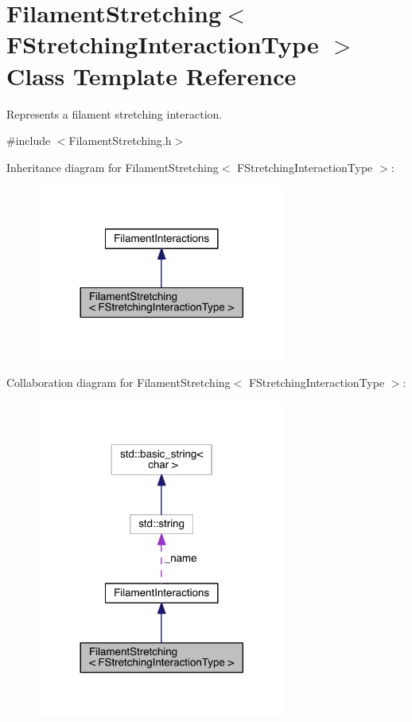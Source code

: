 \hypertarget{classFilamentStretching}{\section{Filament\+Stretching$<$ F\+Stretching\+Interaction\+Type $>$ Class Template Reference}
\label{classFilamentStretching}
}


Represents a filament stretching interaction.  




{\ttfamily \#include $<$Filament\+Stretching.\+h$>$}



Inheritance diagram for Filament\+Stretching$<$ F\+Stretching\+Interaction\+Type $>$\+:\nopagebreak
\begin{figure}[H]
\begin{center}
\leavevmode
\includegraphics[width=233pt]{classFilamentStretching__inherit__graph}
\end{center}
\end{figure}


Collaboration diagram for Filament\+Stretching$<$ F\+Stretching\+Interaction\+Type $>$\+:\nopagebreak
\begin{figure}[H]
\begin{center}
\leavevmode
\includegraphics[width=233pt]{classFilamentStretching__coll__graph}
\end{center}
\end{figure}
